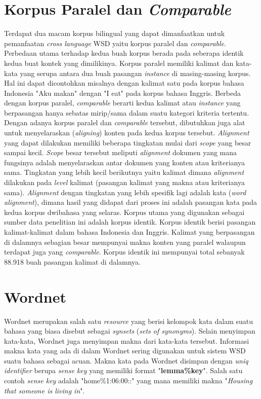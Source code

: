 \section{Korpus Paralel dan \textit{Comparable}}
Terdapat dua macam korpus bilingual yang dapat dimanfaatkan untuk pemanfaatan \textit{cross language } WSD yaitu korpus paralel dan \textit{comparable}. Perbedaan utama terhadap kedua buah korpus berada pada seberapa identik kedua buat kontek yang dimilikinya. Korpus paralel memiliki kalimat dan kata-kata yang serupa antara dua buah pasangan \textit{instance} di masing-masing korpus. Hal ini dapat dicontohkan misalnya dengan kalimat satu pada korpus bahasa Indonesia "Aku makan" dengan "I eat" pada korpus bahasa Inggris. Berbeda dengan korpus paralel, \textit{comparable} berarti kedua kalimat atau \textit{instance} yang berpasangan hanya sebatas mirip/sama dalam suatu kategori kriteria tertentu. Dengan adanya korpus paralel dan \textit{comparable} tersebut, dibutuhkan juga alat untuk menyelaraskan (\textit{aligning}) konten pada kedua korpus tersebut. \textit{Alignment} yang dapat dilakukan memiliki beberapa tingkatan mulai dari \textit{scope} yang besar sampai kecil. \textit{Scope} besar tersebut meliputi \textit{alignment} dokumen yang mana fungsinya adalah menyelaraskan antar dokumen yang konten atau kriterianya sama. Tingkatan yang lebih kecil berikutnya yaitu kalimat dimana \textit{alignment} dilakukan pada \textit{level} kalimat (pasangan kalimat yang makna atau kriterianya sama). \textit{Alignment} dengan tingkatan yang lebih spesifik lagi adalah kata (\textit{word alignment}), dimana hasil yang didapat dari proses ini adalah pasangan kata pada kedua korpus dwibahasa yang selaras. Korpus utama yang digunakan sebagai sumber data penelitian ini adalah korpus identik. Korpus identik berisi pasangan kalimat-kalimat dalam bahasa Indonesia dan Inggris. Kalimat yang berpasangan di dalamnya sebagian besar mempunyai makna konten yang paralel walaupun terdapat juga yang \textit{comparable}. Korpus identik ini mempunyai total sebanyak 88.918 buah pasangan kalimat di dalamnya.

\section{Wordnet}

Wordnet merupakan salah satu \textit{resource} yang berisi kelompok kata dalam suatu bahasa yang biasa disebut sebagai \textit{synsets} (\textit{sets of synonyms}). Selain menyimpan kata-kata, Wordnet juga menyimpan makna dari kata-kata tersebut. Informasi makna kata yang ada di dalam Wordnet sering digunakan untuk sistem WSD suatu bahasa sebagai acuan. Makna kata pada Wordnet disimpan dengan \textit{uniq identifier} berupa \textit{sense key} yang memiliki format "\textbf{lemma\%key}". Salah satu contoh \textit{sense key} adalah "home\%1:06:00::" yang mana memiliki makna "\textit{Housing that someone is living in}".
